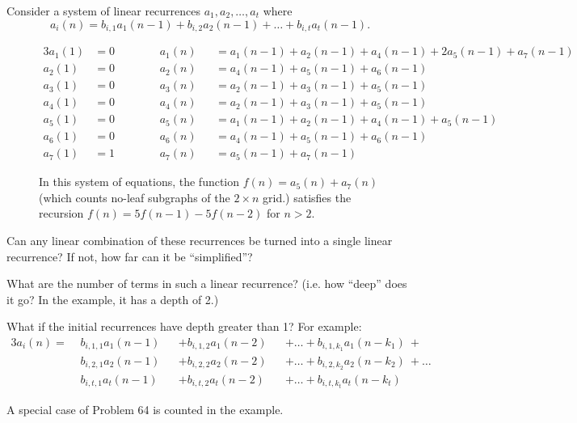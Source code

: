 \documentclass{article}
\begin{document}

Consider a system of linear recurrences $a_1, a_2, \hdots, a_t$ where \[
  a_i(n) = b_{i,1}a_1(n - 1) + b_{i,2}a_2(n - 1) + \hdots + b_{i,t}a_t(n - 1).
\]

\begin{figure}[ht!]
  \centering
  \begin{alignat*}{3}
    a_1(1) &= 0 \hspace{1cm} && a_1(n) &&= a_1(n - 1) + a_2(n - 1) + a_4(n - 1) + 2a_5(n - 1) + a_7(n - 1) \\
    a_2(1) &= 0 \hspace{1cm} && a_2(n) &&= a_4(n - 1) + a_5(n - 1) + a_6(n - 1) \\
    a_3(1) &= 0 \hspace{1cm} && a_3(n) &&= a_2(n - 1) + a_3(n - 1) + a_5(n - 1) \\
    a_4(1) &= 0 \hspace{1cm} && a_4(n) &&= a_2(n - 1) + a_3(n - 1) + a_5(n - 1) \\
    a_5(1) &= 0 \hspace{1cm} && a_5(n) &&= a_1(n - 1) + a_2(n - 1) + a_4(n - 1) + a_5(n - 1) \\
    a_6(1) &= 0 \hspace{1cm} && a_6(n) &&= a_4(n - 1) + a_5(n - 1) + a_6(n - 1) \\
    a_7(1) &= 1 \hspace{1cm} && a_7(n) &&= a_5(n - 1) + a_7(n - 1)
  \end{alignat*}
  \caption{
    In this system of equations, the function $f(n) = a_5(n) + a_7(n)$
    (which counts no-leaf subgraphs of the $2 \times n$ grid.)
    satisfies the recursion $f(n) = 5f(n-1) - 5f(n-2)$ for $n > 2$.
  }
\end{figure}
\begin{question}
  Can any linear combination of these recurrences
  be turned into a single linear recurrence? If not, how far can it be
  ``simplified''?
\end{question}

\begin{related}
  \item What are the number of terms in such a linear recurrence?
  (i.e. how ``deep'' does it go? In the example, it has a depth of 2.)
  \item What if the initial recurrences have depth greater than 1?
  For example:
  \begin{alignat*}{3}
    a_i(n) = \,\,
    & b_{i,1,1}a_1(n - 1) &&+ b_{i,1,2}a_1(n - 2) &&+ \hdots + b_{i,1,k_1}a_1(n - k_1)\ + \\
    & b_{i,2,1}a_2(n - 1) &&+ b_{i,2,2}a_2(n - 2) &&+ \hdots + b_{i,2,k_2}a_2(n - k_2)\ + \hdots \\
    & b_{i,t,1}a_t(n - 1) &&+ b_{i,t,2}a_t(n - 2) &&+ \hdots + b_{i,t,k_t}a_t(n - k_t)
  \end{alignat*}
\end{related}

\begin{references}
  \item A special case of Problem 64 is counted in the example.
\end{references}
\end{document}
